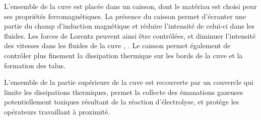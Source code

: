 L'ensemble de la cuve est placée dans un caisson, dont le matériau est
choisi pour ses propriétés ferromagnétiques. La présence du caisson
permet d'écranter une partie du champ d'induction magnétique et
réduire l'intensité de celui-ci dans les fluides. Les forces de
Lorentz peuvent ainsi être contrôlées, et diminuer l'intensité des
vitesses dans les fluides de la cuve \cite{Descloux1998},
\cite{Descloux1991}.  Le caisson permet également de contrôler plus
finement la dissipation thermique sur les bords de la cuve et la
formation des talus.

L'ensemble de la partie supérieure de la cuve est recouverte par un
couvercle qui limite les dissipations thermiques, permet la collecte
des émanations gazeuses potentiellement toxiques résultant de la
réaction d'électrolyse, et protège les opérateurs travaillant à
proximité.

